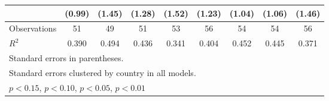 \documentclass[12pt, letterpaper]{article}
\begin{document}
\begin{table}[htbp]
\begin{small}
\begin{tabular}{l*{8}{c}}
                    &      (0.99)         &      (1.45)         &      (1.28)         &      (1.52)         &      (1.23)         &      (1.04)         &      (1.06)         &      (1.46)         \\
\hline
Observations        &          51         &          49         &          51         &          53         &          56         &          54         &          54         &          56         \\
\(R^{2}\)           &       0.390         &       0.494         &       0.436         &       0.341         &       0.404         &       0.452         &       0.445         &       0.371         \\
\hline\hline
\multicolumn{9}{l}{\footnotesize Standard errors in parentheses.}\\
\multicolumn{9}{l}{\footnotesize Standard errors clustered by country in all models.}\\
\multicolumn{9}{l}{\footnotesize \sym{+} \(p<0.15\), \sym{*} \(p<0.10\), \sym{**} \(p<0.05\), \sym{***} \(p<0.01\)}\\
\end{tabular}
\end{small}
\end{table}
\end{document}

